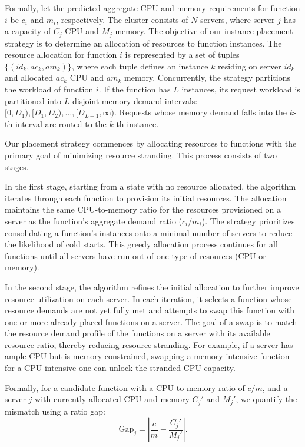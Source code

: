 Formally, let the predicted aggregate CPU and memory requirements for function $i$ be $c_i$ and $m_i$, respectively.
The cluster consists of $N$ servers, where server $j$ has a capacity of $C_j$ CPU and $M_j$ memory.
The objective of our instance placement strategy is to determine an allocation of resources to function instances.
The resource allocation for function $i$ is represented by a set of tuples $\{(id_k, ac_k, am_k)\}$, where each tuple defines an instance $k$ residing on server $id_k$ and allocated $ac_k$ CPU and $am_k$ memory.
Concurrently, the strategy partitions the workload of function $i$.
If the function has $L$ instances, its request workload is partitioned into $L$ disjoint memory demand intervals: $[0, D_1), [D_1, D_2), \dots, [D_{L-1}, \infty)$. Requests whose memory demand falls into the $k$-th interval are routed to the $k$-th instance.

Our placement strategy commences by allocating resources to functions with the primary goal of minimizing resource stranding. This process consists of two stages.

In the first stage, starting from a state with no resource allocated, the algorithm iterates through each function to provision its initial resources.
The allocation maintains the same CPU-to-memory ratio for the resources provisioned on a server as the function's aggregate demand ratio ($c_i/m_i$).
The strategy prioritizes consolidating a function's instances onto a minimal number of servers to reduce the likelihood of cold starts. This greedy allocation process continues for all functions until all servers have run out of one type of resources (CPU or memory).

In the second stage, the algorithm refines the initial allocation to further improve resource utilization on each server.
In each iteration, it selects a function whose resource demands are not yet fully met and attempts to swap this function with one or more already-placed functions on a server.
The goal of a swap is to match the resource demand profile of the functions on a server with its available resource ratio, thereby reducing resource stranding.
For example, if a server has ample CPU but is memory-constrained, swapping a memory-intensive function for a CPU-intensive one can unlock the stranded CPU capacity.

Formally, for a candidate function with a CPU-to-memory ratio of $c/m$, and a server $j$ with currently allocated CPU and memory $C_j'$ and $M_j'$, we quantify the mismatch using a ratio gap:
\begin{equation}
    \text{Gap}_j=\left|\frac{c}{m}-\frac{C_j'}{M_j'}\right|.
\end{equation}

